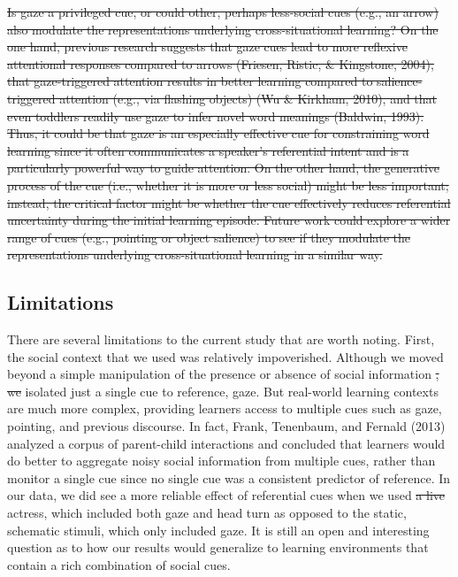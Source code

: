 \documentclass[authoryear, review]{elsarticle}
\providecommand{\DIFaddtex}[1]{{\protect\color{blue}\uwave{#1}}} %
\providecommand{\DIFdeltex}[1]{{\protect\color{red}\sout{#1}}}                      %
\providecommand{\DIFaddbegin}{} %
\providecommand{\DIFaddend}{} %
\providecommand{\DIFdelbegin}{} %
\providecommand{\DIFdelend}{} %
\providecommand{\DIFadd}[1]{\texorpdfstring{\DIFaddtex{#1}}{#1}} %
\providecommand{\DIFdel}[1]{\texorpdfstring{\DIFdeltex{#1}}{}} %
\begin{document}
\DIFdelbegin \DIFdel{Is gaze a privileged cue, or could other, perhaps less-social cues
(e.g., an arrow) also modulate the representations underlying
cross-situational learning? On the one hand, previous research suggests
that gaze cues lead to more reflexive attentional responses compared to
arrows (Friesen, Ristic, \& Kingstone, 2004), that gaze-triggered
attention results in better learning compared to salience-triggered
attention (e.g., via flashing objects) (Wu \& Kirkham, 2010), and that
even toddlers readily use gaze to infer novel word meanings (Baldwin,
1993). Thus, it could be that gaze is an especially effective cue for
constraining word learning since it often communicates a speaker's
referential intent and is a particularly powerful way to guide
attention. On the other hand, the generative process of the cue (i.e.,
whether it is more or less social) might be less important; instead, the
critical factor might be whether the cue effectively reduces referential
uncertainty during the initial learning episode. Future work could
explore a wider range of cues (e.g., pointing or object salience) to see
if they modulate the representations underlying cross-situational
learning in a similar way.
}%

\DIFdelend \subsection{Limitations}\label{limitations}

There are several limitations to the current study that are worth
noting. First, the social context that we used was relatively
impoverished. Although we moved beyond a simple manipulation of the
presence or absence of social information \DIFdelbegin \DIFdel{, we }\DIFdelend \DIFaddbegin \DIFadd{in Experiment 3, we
nevertheless }\DIFaddend isolated just a single cue to reference, gaze. But
real-world learning contexts are much more complex, providing learners
access to multiple cues such as gaze, pointing, and previous discourse.
In fact, Frank, Tenenbaum, and Fernald (2013) analyzed a corpus of
parent-child interactions and concluded that learners would do better to
aggregate noisy social information from multiple cues, rather than
monitor a single cue since no single cue was a consistent predictor of
reference. In our data, we did see a more reliable effect of referential
cues when we used \DIFdelbegin \DIFdel{a live }\DIFdelend \DIFaddbegin \DIFadd{video of an }\DIFaddend actress, which included both gaze and head
turn as opposed to the static, schematic stimuli, which only included
gaze. It is still an open and interesting question as to how our results
would generalize to learning environments that contain a rich
combination of social cues.
\end{document}
